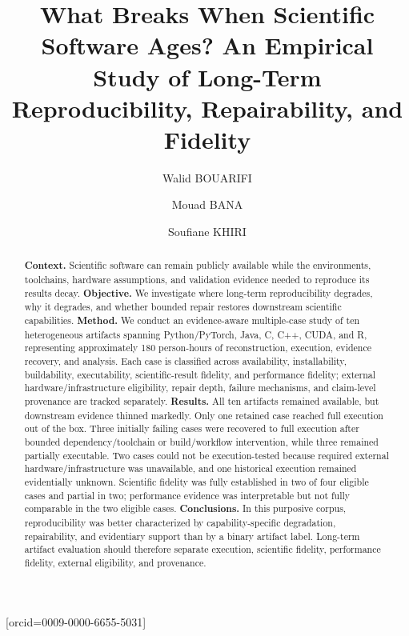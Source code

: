 \documentclass[a4paper,fleqn]{cas-dc}
\begin{document}
\let\WriteBookmarks\relax
\def\floatpagepagefraction{1}
\def\textpagefraction{.001}


\title[mode=title]{What Breaks When Scientific Software Ages? An Empirical Study of Long-Term Reproducibility, Repairability, and Fidelity}

\author[1]{Walid BOUARIFI}[orcid=0009-0000-6655-5031]
\cormark[1]

\author[1]{Mouad BANA}

\author[1]{Soufiane KHIRI}



\begin{abstract}
\textbf{Context.} Scientific software can remain publicly available while the environments, toolchains, hardware assumptions, and validation evidence needed to reproduce its results decay. \textbf{Objective.} We investigate where long-term reproducibility degrades, why it degrades, and whether bounded repair restores downstream scientific capabilities. \textbf{Method.} We conduct an evidence-aware multiple-case study of ten heterogeneous artifacts spanning Python/PyTorch, Java, C, C++, CUDA, and R, representing approximately 180 person-hours of reconstruction, execution, evidence recovery, and analysis. Each case is classified across availability, installability, buildability, executability, scientific-result fidelity, and performance fidelity; external hardware/infrastructure eligibility, repair depth, failure mechanisms, and claim-level provenance are tracked separately. \textbf{Results.} All ten artifacts remained available, but downstream evidence thinned markedly. Only one retained case reached full execution out of the box. Three initially failing cases were recovered to full execution after bounded dependency/toolchain or build/workflow intervention, while three remained partially executable. Two cases could not be execution-tested because required external hardware/infrastructure was unavailable, and one historical execution remained evidentially unknown. Scientific fidelity was fully established in two of four eligible cases and partial in two; performance evidence was interpretable but not fully comparable in the two eligible cases. \textbf{Conclusions.} In this purposive corpus, reproducibility was better characterized by capability-specific degradation, repairability, and evidentiary support than by a binary artifact label. Long-term artifact evaluation should therefore separate execution, scientific fidelity, performance fidelity, external eligibility, and provenance.
\end{abstract}
\end{document}
